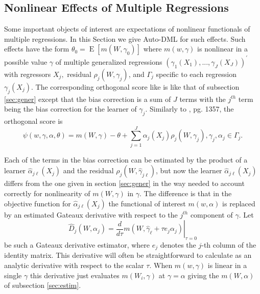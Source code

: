 \documentclass[aos]{imsart}
\numberwithin{equation}{section}
\theoremstyle{plain}
\theoremstyle{remark}
\DeclareMathOperator{\E}{E}
\begin{document}
\subsection{Nonlinear Effects of Multiple Regressions}\label{sec:multip}
Some important objects of interest are expectations of nonlinear functionals of multiple regressions. In this Section we give Auto-DML for such effects. Such effects have the form $\theta_{0}=\E[m(W,\gamma_{0})]$ where $m(w,\gamma)$ is nonlinear in a possible value $\gamma$ of multiple generalized regressions $(\gamma_{1}(X_{1}),...,\gamma_{J}(X_{J}))^{\prime}$ with regressors $X_{j},$ residual $\rho_{j}(W,\gamma_{j})$, and $\Gamma_{j}$ specific to each regression $\gamma_{j}(X_{j})$. The corresponding orthogonal score like is like that of subsection \ref{sec:gener} except that the bias correction is a sum of $J$ terms with the $j^{th}$ term being the bias correction for the learner of $\gamma_{j}$. Similarly to \cite{newey1994asymptotic}, pg. 1357, the orthogonal score is
\begin{equation}
\psi(w,\gamma,\alpha,\theta)=m(W,\gamma)-\theta+\sum_{j=1}^{J}\alpha_j(X_j)\rho_j(W,\gamma_j),\text{
}\gamma_j,\alpha_j\in\Gamma_j.\label{eq:orthmomnonlineargenreg}%
\end{equation}


Each of the terms in the bias correction can be estimated by the product of a learner $\hat{\alpha}_{j\ell}(X_{j})$ and the residual $\rho_{j}(W,\hat{\gamma}_{j\ell})$, but now the learner $\hat{\alpha}_{j\ell}(X_{j})$ differs from the one given in section \ref{sec:gener} in the way needed to account correctly for nonlinearity of $m(W,\gamma)$ in $\gamma$. The difference is that in the objective function for $\hat{\alpha}_{j\ell}(X_{j})$ the functional of interest $m(w,\alpha)$ is replaced by an estimated Gateaux derivative with respect to the $j^{th}$ component of $\gamma.$ Let
\[
\hat{D}_{j}(W,\alpha_{j})=\left.  \frac{d}{d\tau}m(W,\hat{\gamma
}_{\ell}+\tau e_{j}\alpha_{j})\right\vert _{\tau=0}%
\]
be such a Gateaux derivative estimator, where $e_{j}$ denotes the $j$-th column of the identity matrix. This derivative will often be straightforward to calculate as an analytic derivative with respect to the scalar $\tau.$ When $m(w,\gamma)$ is linear in a single $\gamma$ this derivative just evaluates $m(W_{i}, \gamma)$ at $\gamma=\alpha$ giving the $m(W,\alpha)$ of subsection \ref{sec:estim}.
\end{document}
